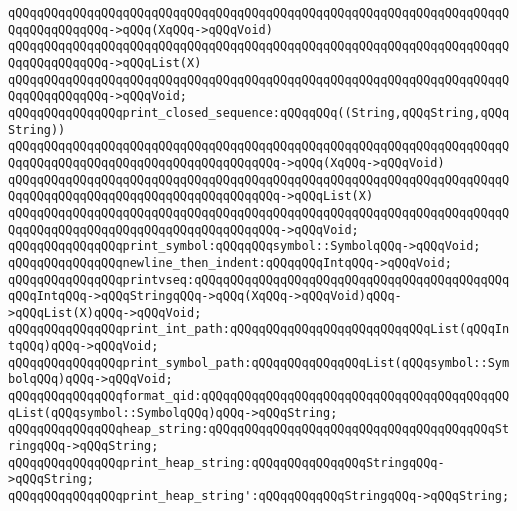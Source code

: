 \verb|qQQqqQQqqQQqqQQqqQQqqQQqqQQqqQQqqQQqqQQqqQQqqQQqqQQqqQQqqQQqqQQqqQQqqQQqqQQqqQQqqQQq->qQQq(XqQQq->qQQqVoid)|\newline
\verb|qQQqqQQqqQQqqQQqqQQqqQQqqQQqqQQqqQQqqQQqqQQqqQQqqQQqqQQqqQQqqQQqqQQqqQQqqQQqqQQqqQQq->qQQqList(X)|\newline
\verb|qQQqqQQqqQQqqQQqqQQqqQQqqQQqqQQqqQQqqQQqqQQqqQQqqQQqqQQqqQQqqQQqqQQqqQQqqQQqqQQqqQQq->qQQqVoid;|\newline
\newline
\verb|qQQqqQQqqQQqqQQqprint_closed_sequence:qQQqqQQq((String,qQQqString,qQQqString))|\newline
\verb|qQQqqQQqqQQqqQQqqQQqqQQqqQQqqQQqqQQqqQQqqQQqqQQqqQQqqQQqqQQqqQQqqQQqqQQqqQQqqQQqqQQqqQQqqQQqqQQqqQQqqQQqqQQq->qQQq(XqQQq->qQQqVoid)|\newline
\verb|qQQqqQQqqQQqqQQqqQQqqQQqqQQqqQQqqQQqqQQqqQQqqQQqqQQqqQQqqQQqqQQqqQQqqQQqqQQqqQQqqQQqqQQqqQQqqQQqqQQqqQQqqQQq->qQQqList(X)|\newline
\verb|qQQqqQQqqQQqqQQqqQQqqQQqqQQqqQQqqQQqqQQqqQQqqQQqqQQqqQQqqQQqqQQqqQQqqQQqqQQqqQQqqQQqqQQqqQQqqQQqqQQqqQQqqQQq->qQQqVoid;|\newline
\newline
\verb|qQQqqQQqqQQqqQQqprint_symbol:qQQqqQQqsymbol::SymbolqQQq->qQQqVoid;|\newline
\newline
\verb|qQQqqQQqqQQqqQQqnewline_then_indent:qQQqqQQqIntqQQq->qQQqVoid;|\newline
\verb|qQQqqQQqqQQqqQQqprintvseq:qQQqqQQqqQQqqQQqqQQqqQQqqQQqqQQqqQQqqQQqqQQqqQQqIntqQQq->qQQqStringqQQq->qQQq(XqQQq->qQQqVoid)qQQq->qQQqList(X)qQQq->qQQqVoid;|\newline
\newline
\verb|qQQqqQQqqQQqqQQqprint_int_path:qQQqqQQqqQQqqQQqqQQqqQQqqQQqList(qQQqIntqQQq)qQQq->qQQqVoid;|\newline
\verb|qQQqqQQqqQQqqQQqprint_symbol_path:qQQqqQQqqQQqqQQqList(qQQqsymbol::SymbolqQQq)qQQq->qQQqVoid;|\newline
\newline
\verb|qQQqqQQqqQQqqQQqformat_qid:qQQqqQQqqQQqqQQqqQQqqQQqqQQqqQQqqQQqqQQqqQQqList(qQQqsymbol::SymbolqQQq)qQQq->qQQqString;|\newline
\verb|qQQqqQQqqQQqqQQqheap_string:qQQqqQQqqQQqqQQqqQQqqQQqqQQqqQQqqQQqqQQqStringqQQq->qQQqString;|\newline
\verb|qQQqqQQqqQQqqQQqprint_heap_string:qQQqqQQqqQQqqQQqStringqQQq->qQQqString;|\newline
\verb|qQQqqQQqqQQqqQQqprint_heap_string':qQQqqQQqqQQqStringqQQq->qQQqString;|\newline
